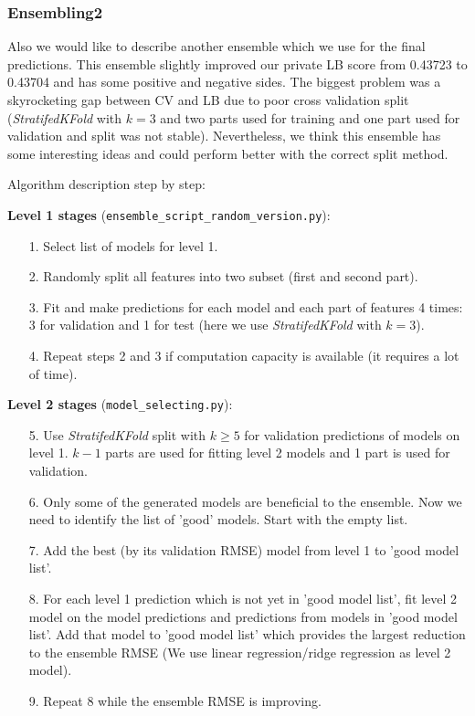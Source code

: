 \documentclass[12pt]{article}
\begin{document}
\subsubsection{Ensembling2}
Also we would like to describe another ensemble which we use for the final predictions.
This ensemble slightly improved our private LB score from 0.43723 to 0.43704 and has some positive and negative sides. The biggest problem was a skyrocketing gap between CV and LB due to poor cross validation split (\emph{StratifedKFold} with $k = 3$ and two parts used for training and one part used for validation and split was not stable). Nevertheless, we think this ensemble has some interesting ideas and could perform better with the correct split method.

Algorithm description step by step:

\textbf{Level 1 stages} (\texttt{ensemble\_script\_random\_version.py}):
\begin{itemize}
\item[1.] Select list of models for level 1.
\item[2.] Randomly split all features into two subset (first and second part).
\item[3.] Fit and make predictions for each model and each part of features 4 times: 3 for validation and 1 for test (here we use \emph{StratifedKFold} with $k = 3$).
\item[4.] Repeat steps 2 and 3 if computation capacity is available (it requires a lot of time).
\end{itemize}

\textbf{Level 2 stages} (\texttt{model\_selecting.py}):
\begin{itemize}
\item[5.] Use \emph{StratifedKFold} split with $k \geq 5$ for validation predictions of models on level 1. $k-1$ parts are used for fitting level 2 models and 1 part is used for validation.
\item[6.] Only some of the generated models are beneficial to the ensemble. Now we need to identify the list of 'good' models. Start with the empty list.
\item[7.] Add the best (by its validation RMSE) model from level 1 to 'good model list'.
\item[8.] For each level 1 prediction which is not yet in 'good model list', fit level 2 model on the model predictions and predictions from models in 'good model list'. Add that model to 'good model list'  which provides the largest reduction to the ensemble RMSE (We use linear regression/ridge regression as level 2 model).
\item[9.] Repeat 8 while the ensemble RMSE is improving.
\end{itemize}
\end{document}
